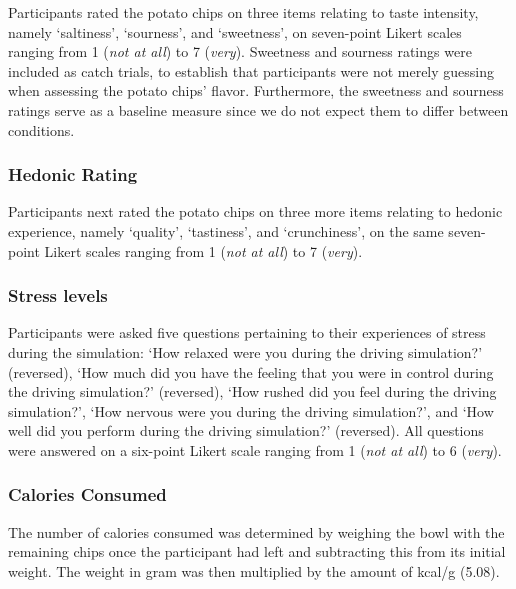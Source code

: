 \documentclass[authordate, empirical]{jote-new-article}
\begin{document}
Participants rated the potato chips on three items relating to taste intensity, namely ‘saltiness’, ‘sourness’, and ‘sweetness’, on seven-point Likert scales ranging from 1 (\emph{not at all}) to 7 (\emph{very}). Sweetness and sourness ratings were included as catch trials, to establish that participants were not merely guessing when assessing the potato chips’ flavor. Furthermore, the sweetness and sourness ratings serve as a baseline measure since we do not expect them to differ between conditions.



\subsubsection{Hedonic Rating }



Participants next rated the potato chips on three more items relating to hedonic experience, namely ‘quality’, ‘tastiness’, and ‘crunchiness’, on the same seven-point Likert scales ranging from 1 (\emph{not at all}) to 7 (\emph{very}).



\subsubsection{Stress levels}



Participants were asked five questions pertaining to their experiences of stress during the simulation: ‘How relaxed were you during the driving simulation?’ (reversed), ‘How much did you have the feeling that you were in control during the driving simulation?’ (reversed), ‘How rushed did you feel during the driving simulation?’, ‘How nervous were you during the driving simulation?’, and ‘How well did you perform during the driving simulation?’ (reversed). All questions were answered on a six-point Likert scale ranging from 1 (\emph{not at all}) to 6 (\emph{very}).



\subsubsection{Calories Consumed }



The number of calories consumed was determined by weighing the bowl with the remaining chips once the participant had left and subtracting this from its initial weight. The weight in gram was then multiplied by the amount of kcal/g (5.08).
\end{document}
